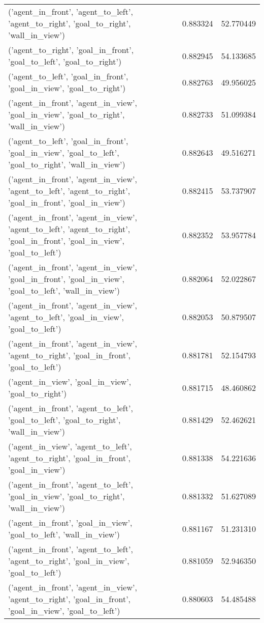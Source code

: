 \begin{tabular}{lrr}
('agent\_in\_front', 'agent\_to\_left', 'agent\_to\_right', 'goal\_to\_right', 'wall\_in\_view') & 0.883324 & 52.770449 \\
('agent\_to\_right', 'goal\_in\_front', 'goal\_to\_left', 'goal\_to\_right') & 0.882945 & 54.133685 \\
('agent\_to\_left', 'goal\_in\_front', 'goal\_in\_view', 'goal\_to\_right') & 0.882763 & 49.956025 \\
('agent\_in\_front', 'agent\_in\_view', 'goal\_in\_view', 'goal\_to\_right', 'wall\_in\_view') & 0.882733 & 51.099384 \\
('agent\_to\_left', 'goal\_in\_front', 'goal\_in\_view', 'goal\_to\_left', 'goal\_to\_right', 'wall\_in\_view') & 0.882643 & 49.516271 \\
('agent\_in\_front', 'agent\_in\_view', 'agent\_to\_left', 'agent\_to\_right', 'goal\_in\_front', 'goal\_in\_view') & 0.882415 & 53.737907 \\
('agent\_in\_front', 'agent\_in\_view', 'agent\_to\_left', 'agent\_to\_right', 'goal\_in\_front', 'goal\_in\_view', 'goal\_to\_left') & 0.882352 & 53.957784 \\
('agent\_in\_front', 'agent\_in\_view', 'goal\_in\_front', 'goal\_in\_view', 'goal\_to\_left', 'wall\_in\_view') & 0.882064 & 52.022867 \\
('agent\_in\_front', 'agent\_in\_view', 'agent\_to\_left', 'goal\_in\_view', 'goal\_to\_left') & 0.882053 & 50.879507 \\
('agent\_in\_front', 'agent\_in\_view', 'agent\_to\_right', 'goal\_in\_front', 'goal\_to\_left') & 0.881781 & 52.154793 \\
('agent\_in\_view', 'goal\_in\_view', 'goal\_to\_right') & 0.881715 & 48.460862 \\
('agent\_in\_front', 'agent\_to\_left', 'goal\_to\_left', 'goal\_to\_right', 'wall\_in\_view') & 0.881429 & 52.462621 \\
('agent\_in\_view', 'agent\_to\_left', 'agent\_to\_right', 'goal\_in\_front', 'goal\_in\_view') & 0.881338 & 54.221636 \\
('agent\_in\_front', 'agent\_to\_left', 'goal\_in\_view', 'goal\_to\_right', 'wall\_in\_view') & 0.881332 & 51.627089 \\
('agent\_in\_front', 'goal\_in\_view', 'goal\_to\_left', 'wall\_in\_view') & 0.881167 & 51.231310 \\
('agent\_in\_front', 'agent\_to\_left', 'agent\_to\_right', 'goal\_in\_view', 'goal\_to\_left') & 0.881059 & 52.946350 \\
('agent\_in\_front', 'agent\_in\_view', 'agent\_to\_right', 'goal\_in\_front', 'goal\_in\_view', 'goal\_to\_left') & 0.880603 & 54.485488 \\

\end{tabular}
